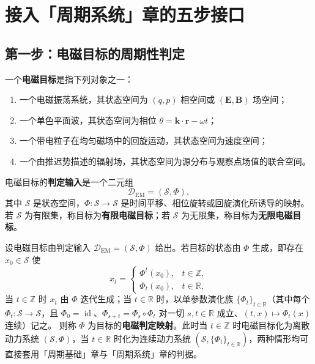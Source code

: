 \section{接入「周期系统」章的五步接口}
\label{sec:em_five_steps}

\subsection{第一步：电磁目标的周期性判定}

\begin{definition}[电磁目标与判定输入]\label{def:em_target}
一个\textbf{电磁目标}是指下列对象之一：
\begin{enumerate}[label=(\roman*)]
    \item 一个电磁振荡系统，其状态空间为 $(q,p)$ 相空间或 $(\mathbf E,\mathbf B)$ 场空间；
    \item 一个单色平面波，其状态空间为相位 $\theta=\mathbf k\cdot\mathbf r-\omega t$；
    \item 一个带电粒子在均匀磁场中的回旋运动，其状态空间为速度空间；
    \item 一个由推迟势描述的辐射场，其状态空间为源分布与观察点场值的联合空间。
\end{enumerate}
电磁目标的\textbf{判定输入}是一个二元组
\[
\mathcal D_{\mathrm{EM}}=(\mathcal S,\Phi),
\]
其中 $\mathcal S$ 是状态空间，$\Phi:\mathcal S\to\mathcal S$ 是时间平移、相位旋转或回旋演化所诱导的映射。若 $\mathcal S$ 为有限集，称目标为\textbf{有限电磁目标}；若 $\mathcal S$ 为无限集，称目标为\textbf{无限电磁目标}。
\end{definition}

\begin{definition}[电磁判定映射]\label{def:em_periodization}
设电磁目标由判定输入 $\mathcal D_{\mathrm{EM}}=(\mathcal S,\Phi)$ 给出。若目标的状态由 $\Phi$ 生成，即存在 $x_0\in\mathcal S$ 使
\[
x_t=\begin{cases}\Phi^t(x_0), & t\in\mathbb Z,\\ \Phi_t(x_0), & t\in\mathbb R,\end{cases}
\]
当 $t\in\mathbb Z$ 时 $x_t$ 由 $\Phi$ 迭代生成；当 $t\in\mathbb R$ 时，以单参数演化族 $\{\Phi_t\}_{t\in\mathbb R}$（其中每个 $\Phi_t:\mathcal S\to\mathcal S$，且 $\Phi_0=\operatorname{id}$、$\Phi_{s+t}=\Phi_s\circ\Phi_t$ 对一切 $s,t\in\mathbb R$ 成立、$(t,x)\mapsto\Phi_t(x)$ 连续）记之。
则称 $\Phi$ 为目标的\textbf{电磁判定映射}。此时当 $t\in\mathbb Z$ 时电磁目标化为离散动力系统 $(\mathcal S,\Phi)$，当 $t\in\mathbb R$ 时化为连续动力系统 $(\mathcal S,\{\Phi_t\}_{t\in\mathbb R})$，两种情形均可直接套用「周期基础」章与「周期系统」章的判据。
\end{definition}

